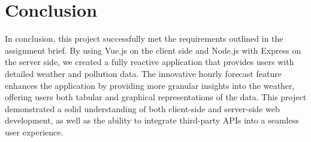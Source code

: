 \documentclass{article}
\begin{document}
\section*{Conclusion}

In conclusion, this project successfully met the requirements outlined in the assignment brief. By using Vue.js on the client side and Node.js with Express on the server side, we created a fully reactive application that provides users with detailed weather and pollution data. The innovative hourly forecast feature enhances the application by providing more granular insights into the weather, offering users both tabular and graphical representations of the data. This project demonstrated a solid understanding of both client-side and server-side web development, as well as the ability to integrate third-party APIs into a seamless user experience.
\end{document}
